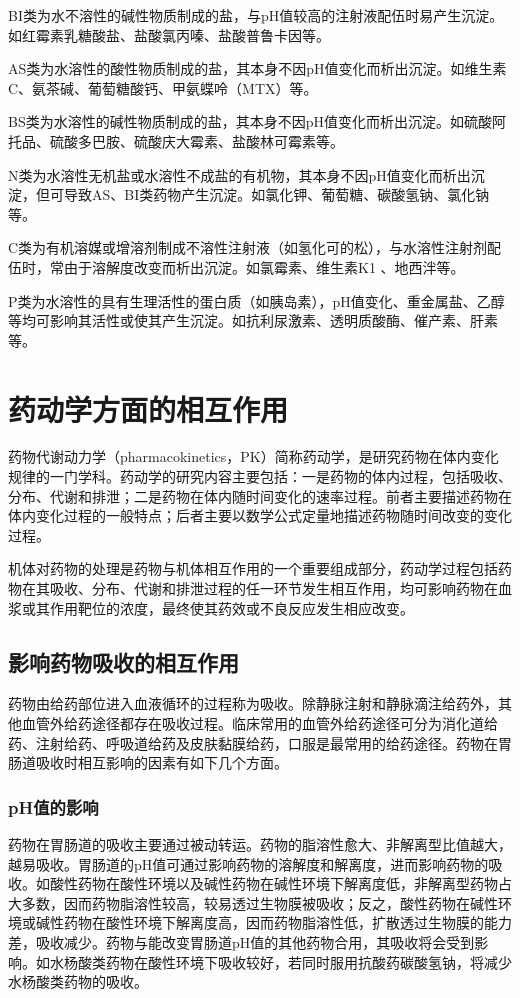 BI类为水不溶性的碱性物质制成的盐，与pH值较高的注射液配伍时易产生沉淀。如红霉素乳糖酸盐、盐酸氯丙嗪、盐酸普鲁卡因等。

AS类为水溶性的酸性物质制成的盐，其本身不因pH值变化而析出沉淀。如维生素C、氨茶碱、葡萄糖酸钙、甲氨蝶呤（MTX）等。

BS类为水溶性的碱性物质制成的盐，其本身不因pH值变化而析出沉淀。如硫酸阿托品、硫酸多巴胺、硫酸庆大霉素、盐酸林可霉素等。

N类为水溶性无机盐或水溶性不成盐的有机物，其本身不因pH值变化而析出沉淀，但可导致AS、BI类药物产生沉淀。如氯化钾、葡萄糖、碳酸氢钠、氯化钠等。

C类为有机溶媒或增溶剂制成不溶性注射液（如氢化可的松），与水溶性注射剂配伍时，常由于溶解度改变而析出沉淀。如氯霉素、维生素K{1}
、地西泮等。

P类为水溶性的具有生理活性的蛋白质（如胰岛素），pH值变化、重金属盐、乙醇等均可影响其活性或使其产生沉淀。如抗利尿激素、透明质酸酶、催产素、肝素等。

\section{药动学方面的相互作用}

药物代谢动力学（pharmacokinetics，PK）简称药动学，是研究药物在体内变化规律的一门学科。药动学的研究内容主要包括：一是药物的体内过程，包括吸收、分布、代谢和排泄；二是药物在体内随时间变化的速率过程。前者主要描述药物在体内变化过程的一般特点；后者主要以数学公式定量地描述药物随时间改变的变化过程。

机体对药物的处理是药物与机体相互作用的一个重要组成部分，药动学过程包括药物在其吸收、分布、代谢和排泄过程的任一环节发生相互作用，均可影响药物在血浆或其作用靶位的浓度，最终使其药效或不良反应发生相应改变。

\subsection{影响药物吸收的相互作用}

药物由给药部位进入血液循环的过程称为吸收。除静脉注射和静脉滴注给药外，其他血管外给药途径都存在吸收过程。临床常用的血管外给药途径可分为消化道给药、注射给药、呼吸道给药及皮肤黏膜给药，口服是最常用的给药途径。药物在胃肠道吸收时相互影响的因素有如下几个方面。

\subsubsection{pH值的影响}

药物在胃肠道的吸收主要通过被动转运。药物的脂溶性愈大、非解离型比值越大，越易吸收。胃肠道的pH值可通过影响药物的溶解度和解离度，进而影响药物的吸收。如酸性药物在酸性环境以及碱性药物在碱性环境下解离度低，非解离型药物占大多数，因而药物脂溶性较高，较易透过生物膜被吸收；反之，酸性药物在碱性环境或碱性药物在酸性环境下解离度高，因而药物脂溶性低，扩散透过生物膜的能力差，吸收减少。药物与能改变胃肠道pH值的其他药物合用，其吸收将会受到影响。如水杨酸类药物在酸性环境下吸收较好，若同时服用抗酸药碳酸氢钠，将减少水杨酸类药物的吸收。

